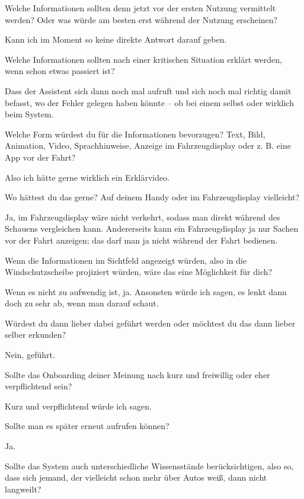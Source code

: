 \interviewerin
Welche Informationen sollten denn jetzt vor der ersten Nutzung
vermittelt werden? Oder was würde am besten erst während der Nutzung
erscheinen?

Kann ich im Moment so keine direkte Antwort darauf geben.

\interviewerin
Welche Informationen sollten nach einer kritischen Situation erklärt
werden, wenn schon etwas passiert ist?

Dass der Assistent sich dann noch mal aufruft und sich noch mal richtig
damit befasst, wo der Fehler gelegen haben könnte – ob bei einem selbst
oder wirklich beim System.

\interviewerin
Welche Form würdest du für die Informationen bevorzugen? Text, Bild,
Animation, Video, Sprachhinweise, Anzeige im Fahrzeugdisplay oder z. B.
eine App vor der Fahrt?

Also ich hätte gerne wirklich ein Erklärvideo.

\interviewerin
Wo hättest du das gerne? Auf deinem Handy oder im Fahrzeugdisplay
vielleicht?

Ja, im Fahrzeugdisplay wäre nicht verkehrt, sodass man direkt während
des Schauens vergleichen kann. Andererseits kann ein Fahrzeugdisplay ja
nur Sachen vor der Fahrt anzeigen; das darf man ja nicht während der
Fahrt bedienen.

\interviewerin
Wenn die Informationen im Sichtfeld angezeigt würden, also in die
Windschutzscheibe projiziert würden, wäre das eine Möglichkeit für dich?

Wenn es nicht zu aufwendig ist, ja. Ansonsten würde ich sagen, es lenkt
dann doch zu sehr ab, wenn man darauf schaut.

\interviewerin
Würdest du dann lieber dabei geführt werden oder möchtest du das dann
lieber selber erkunden?

Nein, geführt.

\interviewerin
Sollte das Onboarding deiner Meinung nach kurz und freiwillig oder eher
verpflichtend sein?

Kurz und verpflichtend würde ich sagen.

\interviewerin
Sollte man es später erneut aufrufen können?

Ja.

\interviewerin
Sollte das System auch unterschiedliche Wissensstände berücksichtigen,
also so, dass sich jemand, der vielleicht schon mehr über Autos weiß,
dann nicht langweilt?

